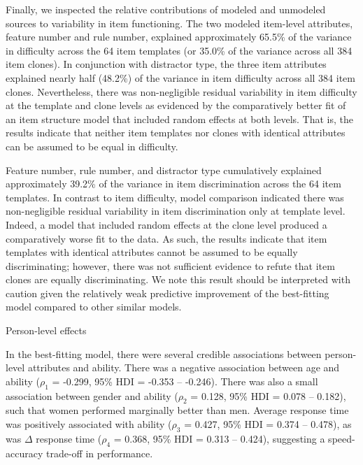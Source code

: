 \documentclass[a4paper,man,natbib]{apa6}
\makeatletter
\renewcommand{\subsubsection}{\@startsection{subsubsection}{3}
  {\z@}%
  {\b@level@two@skip}{\e@level@two@skip}%
  {\normalfont\normalsize\bfseries}}
\makeatother
\begin{document}
Finally, we inspected the relative contributions of modeled and unmodeled sources to variability in item functioning. The two modeled item-level attributes, feature number and rule number, explained approximately 65.5\% of the variance in difficulty across the 64 item templates (or 35.0\% of the variance across all 384 item clones). In conjunction with distractor type, the three item attributes explained nearly half (48.2\%) of the variance in item difficulty across all 384 item clones. Nevertheless, there was non-negligible residual variability in item difficulty at the template and clone levels as evidenced by the comparatively better fit of an item structure model that included random effects at both levels. That is, the results indicate that neither item templates nor clones with identical attributes can be assumed to be equal in difficulty. 

Feature number, rule number, and distractor type cumulatively explained approximately 39.2\% of the variance in item discrimination across the 64 item templates. In contrast to item difficulty, model comparison indicated there was non-negligible residual variability in item discrimination only at template level. Indeed, a model that included random effects at the clone level produced a comparatively worse fit to the data. As such, the results indicate that item templates with identical attributes cannot be assumed to be equally discriminating; however, there was not sufficient evidence to refute that item clones are equally discriminating. We note this result should be interpreted with caution given the relatively weak predictive improvement of the best-fitting model compared to other similar models.

\subsubsection{Person-level effects}

In the best-fitting model, there were several credible associations between person-level attributes and ability. There was a negative association between age and ability ($\rho_1$ = -0.299, 95\% HDI = -0.353 -- -0.246). There was also a small association between gender and ability ($\rho_2$ = 0.128, 95\% HDI = 0.078 -- 0.182), such that women performed marginally better than men. Average response time was positively associated with ability ($\rho_3$ = 0.427, 95\% HDI = 0.374 -- 0.478), as was $\Delta$ response time ($\rho_4$ = 0.368, 95\% HDI = 0.313 -- 0.424), suggesting a speed-accuracy trade-off in performance.
\end{document}
